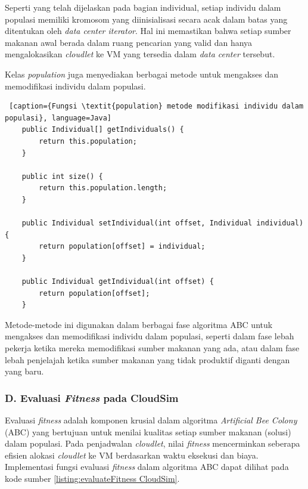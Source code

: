 Seperti yang telah dijelaskan pada bagian individual, setiap individu dalam populasi memiliki kromosom yang diinisialisasi secara acak dalam batas yang ditentukan oleh \textit{data center iterator}. Hal ini memastikan bahwa setiap sumber makanan awal berada dalam ruang pencarian yang valid dan hanya mengalokasikan \textit{cloudlet} ke VM yang tersedia dalam \textit{data center} tersebut.

Kelas \textit{population} juga menyediakan berbagai metode untuk mengakses dan memodifikasi individu dalam populasi.

\begin{lstlisting} [caption={Fungsi \textit{population} metode modifikasi individu dalam populasi}, language=Java]
    public Individual[] getIndividuals() {
        return this.population;
    }

    public int size() {
        return this.population.length;
    }

    public Individual setIndividual(int offset, Individual individual) {
        return population[offset] = individual;
    }

    public Individual getIndividual(int offset) {
        return population[offset];
    }
\end{lstlisting}

Metode-metode ini digunakan dalam berbagai fase algoritma ABC untuk mengakses dan memodifikasi individu dalam populasi, seperti dalam fase lebah pekerja ketika mereka memodifikasi sumber makanan yang ada, atau dalam fase lebah penjelajah ketika sumber makanan yang tidak produktif diganti dengan yang baru.

\subsubsection{D. Evaluasi \textit{Fitness} pada CloudSim}
Evaluasi \textit{fitness} adalah komponen krusial dalam algoritma \textit{Artificial Bee Colony} (ABC) yang bertujuan untuk menilai kualitas setiap sumber makanan (solusi) dalam populasi. Pada penjadwalan \textit{cloudlet}, nilai \textit{fitness} mencerminkan seberapa efisien alokasi \textit{cloudlet} ke VM berdasarkan waktu eksekusi dan biaya. Implementasi fungsi evaluasi \textit{fitness} dalam algoritma ABC dapat dilihat pada kode sumber \ref{listing:evaluateFitness CloudSim}.

